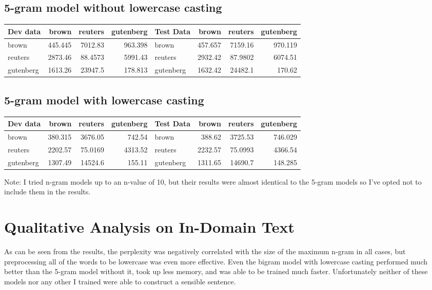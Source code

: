 \documentclass{article}
\begin{document}
\subsection{5-gram model without lowercase casting}

\begin{tabular}{lrrr|lrrr}
\hline
Dev data   &    brown &   reuters &   gutenberg & Test Data &     brown &   reuters &   gutenberg \\
\hline
 brown     &  445.445 &  7012.83   &     963.398 & brown     &  457.657 &  7159.16   &     970.119 \\
 reuters   & 2873.46  &    88.4573 &    5991.43  & reuters   & 2932.42  &    87.9802 &    6074.51  \\
 gutenberg & 1613.26  & 23947.5    &     178.813 & gutenberg & 1632.42  & 24482.1    &     170.62  \\
\hline
\end{tabular}

\subsection{5-gram model with lowercase casting}

\begin{tabular}{lrrr|lrrr}
\hline
Dev data   &    brown &   reuters &   gutenberg & Test Data &     brown &   reuters &   gutenberg \\
\hline
 brown     &  380.315 &  3676.05   &      742.54 & brown     &  388.62 &  3725.53   &     746.029 \\
 reuters   & 2202.57  &    75.0169 &     4313.52 & reuters   & 2232.57 &    75.0993 &    4366.54  \\
 gutenberg & 1307.49  & 14524.6    &      155.11 & gutenberg & 1311.65 & 14690.7    &     148.285 \\
\hline
\end{tabular}
\linespread{1}
Note: I tried n-gram models up to an n-value of 10, but their results were almost identical to the 5-gram models so I've opted not to include them in the results.

\section{Qualitative Analysis on In-Domain Text}
\quad As can be seen from the results, the perplexity was negatively correlated with the size of the maximum n-gram in all cases, but preprocessing all of the words to be lowercase was even more effective. Even the bigram model with lowercase casting performed much better than the 5-gram model without it, took up less memory, and was able to be trained much faster. Unfortunately neither of these models nor any other I trained were able to construct a sensible sentence.
\end{document}
